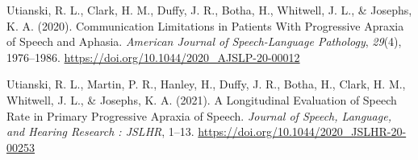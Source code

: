 \documentclass[11pt, a4paper]{awesome-cv}
\begin{document}
\leavevmode\hypertarget{ref-utianski_communication_2020}{}%
Utianski, R. L., Clark, H. M., Duffy, J. R., Botha, H., Whitwell, J. L.,
\& Josephs, K. A. (2020). Communication {Limitations} in {Patients}
{With} {Progressive} {Apraxia} of {Speech} and {Aphasia}. \emph{American
Journal of Speech-Language Pathology}, \emph{29}(4), 1976--1986.
\url{https://doi.org/10.1044/2020_AJSLP-20-00012}

\leavevmode\hypertarget{ref-utianski_longitudinal_2021}{}%
Utianski, R. L., Martin, P. R., Hanley, H., Duffy, J. R., Botha, H.,
Clark, H. M., Whitwell, J. L., \& Josephs, K. A. (2021). A
{Longitudinal} {Evaluation} of {Speech} {Rate} in {Primary}
{Progressive} {Apraxia} of {Speech}. \emph{Journal of Speech, Language,
and Hearing Research : JSLHR}, 1--13.
\url{https://doi.org/10.1044/2020_JSLHR-20-00253}

\endgroup
\end{document}
